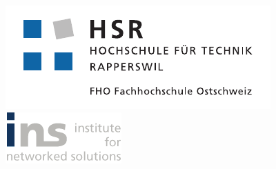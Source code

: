 \begin{titlepage}
\begin{flushleft}

\begin{figure}[tbp]
  \begin{minipage}[c]{0.4\textwidth}
    \includegraphics[width=\textwidth]{images/hsr_logo.pdf}
  \end{minipage}
  \hfill
  \begin{minipage}[c]{0.3\textwidth}
    \includegraphics[width=\textwidth]{images/ins_logo.png}
  \end{minipage}
\end{figure}



\noindent\begin{minipage}[t]{0.49\textwidth}
  \begin{flushleft}
    \vspace{0pt}
  \end{flushleft}
\end{minipage}
\hfill
\begin{minipage}[t]{0.49\textwidth}
  \begin{flushright}
    \vspace{0pt}
  \end{flushright}
\end{minipage}
\\[4cm]

{\Huge \bfseries \TITLE}\\[4cm]
{\huge \bfseries \SUBTITLE}\\[0.5cm]


\end{flushleft}
\end{titlepage}
